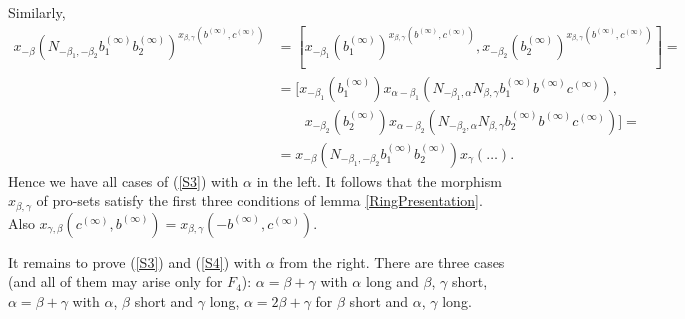 \documentclass{article}
\theoremstyle{definition}
\theoremstyle{remark}
\begin{document}
 Similarly,
 \begin{align*}
  x_{-\beta}(N_{-\beta_1, -\beta_2} b_1^{(\infty)} b_2^{(\infty)})^{x_{\beta, \gamma}(b^{(\infty)}, c^{(\infty)})} &= [x_{-\beta_1}(b_1^{(\infty)})^{x_{\beta, \gamma}(b^{(\infty)}, c^{(\infty)})}, x_{-\beta_2}(b_2^{(\infty)})^{x_{\beta, \gamma}(b^{(\infty)}, c^{(\infty)})}] =\\
  &= [x_{-\beta_1}(b_1^{(\infty)}) x_{\alpha - \beta_1}(N_{-\beta_1, \alpha} N_{\beta, \gamma} b_1^{(\infty)} b^{(\infty)} c^{(\infty)}),\\
  &\qquad x_{-\beta_2}(b_2^{(\infty)}) x_{\alpha - \beta_2}(N_{-\beta_2, \alpha} N_{\beta, \gamma} b_2^{(\infty)} b^{(\infty)} c^{(\infty)})] =\\
  &= x_{-\beta}(N_{-\beta_1, -\beta_2}  b_1^{(\infty)} b_2^{(\infty)}) x_\gamma(\ldots).
 \end{align*}
 Hence we have all cases of (\ref{S3}) with \(\alpha\) in the left. It follows that the morphism \(x_{\beta, \gamma}\) of pro-sets satisfy the first three conditions of lemma \ref{RingPresentation}. Also \(x_{\gamma, \beta}(c^{(\infty)}, b^{(\infty)}) = x_{\beta, \gamma}(-b^{(\infty)}, c^{(\infty)})\).

 It remains to prove (\ref{S3}) and (\ref{S4}) with \(\alpha\) from the right. There are three cases (and all of them may arise only for \(F_4\)): \(\alpha = \beta + \gamma\) with \(\alpha\) long and \(\beta\), \(\gamma\) short, \(\alpha = \beta + \gamma\) with \(\alpha\), \(\beta\) short and \(\gamma\) long, \(\alpha = 2\beta + \gamma\) for \(\beta\) short and \(\alpha\), \(\gamma\) long.
\end{document}
